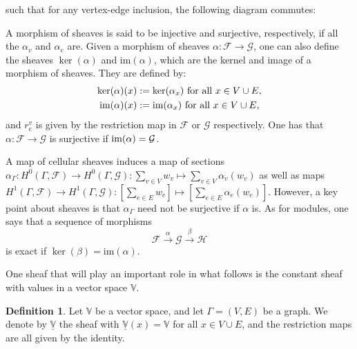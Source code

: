 \documentclass{article}
\theoremstyle{definition}
\newtheorem{definition}[theorem]{Definition}
\theoremstyle{remark}
\newcommand{\im}{\textup{im}}
\begin{document}
such that for any vertex-edge inclusion, the following diagram commutes:
\begin{center}
\end{center}

A morphism of sheaves is said to be injective and surjective, respectively, if all the $\alpha_v$ and $\alpha_e$ are. Given a morphism of sheaves $\alpha: \mathcal{F}\rightarrow \mathcal{G}$, one can also define the sheaves $\ker(\alpha)$ and $\text{im}(\alpha)$, which are the kernel and image of a morphism of sheaves. They are defined by:
\begin{align*}
    \ker(\alpha)(x) &:= \ker(\alpha_x) \text{ for all  } x\in V\cup E,\\
    \im(\alpha)(x) &:= \im(\alpha_x) \text{ for all  } x\in V\cup E,
\end{align*}
and $r^{v}_e$ is given by the restriction map in $\mathcal{F}$ or $\mathcal{G}$ respectively. One has that $\alpha: \mathcal{F} \rightarrow \mathcal{G}$ is surjective if $\im(\alpha) = \mathcal{G}$.

A map of cellular sheaves induces a map of sections $\alpha_{\Gamma}: H^{0}(\Gamma,\mathcal{F}) \rightarrow H^{0}(\Gamma,\mathcal{G}): \sum_{v\in V} w_v \mapsto \sum_{v\in V} \alpha_{v}(w_v)$ as well as maps $H^{1}(\Gamma,\mathcal{F}) \rightarrow H^{1}(\Gamma,\mathcal{G}): [\sum_{e\in E} w_{e}]\mapsto [\sum_{e\in E} \alpha_{e}(w_{e})]$. However, a key point about sheaves is that $\alpha_{\Gamma}$ need not be surjective if $\alpha$ is. As for modules, one says that a sequence of morphisms 
\begin{equation*}
    \mathcal{F} \xrightarrow{\alpha} \mathcal{G}\xrightarrow {\beta}\mathcal{H} 
\end{equation*}
is exact if $\ker(\beta)=\text{im}(\alpha)$.

One sheaf that will play an important role in what follows is the constant sheaf with values in a vector space $\mathbb{V}$.
\begin{definition}
    Let $\mathbb{V}$ be a vector space, and let $\Gamma=(V,E)$ be a graph. We denote by $\underline{\mathbb{V}}$ the sheaf with $\underline{\mathbb{V}}(x) = \mathbb{V}$ for all $x\in V\cup E$, and the restriction maps are all given by the identity. 
\end{definition}
\end{document}

